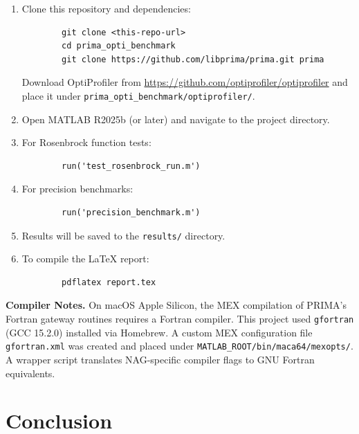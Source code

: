 \documentclass[11pt,a4paper]{article}
\begin{document}
\begin{enumerate}[leftmargin=*]
    \item Clone this repository and dependencies:
        \begin{verbatim}
        git clone <this-repo-url>
        cd prima_opti_benchmark
        git clone https://github.com/libprima/prima.git prima
        \end{verbatim}
        Download OptiProfiler from
        \url{https://github.com/optiprofiler/optiprofiler} and place it
        under \texttt{prima\_opti\_benchmark/optiprofiler/}.

    \item Open MATLAB R2025b (or later) and navigate to the project directory.

    \item For Rosenbrock function tests:
        \begin{verbatim}
        run('test_rosenbrock_run.m')
        \end{verbatim}

    \item For precision benchmarks:
        \begin{verbatim}
        run('precision_benchmark.m')
        \end{verbatim}

    \item Results will be saved to the \texttt{results/} directory.

    \item To compile the LaTeX report:
        \begin{verbatim}
        pdflatex report.tex
        \end{verbatim}
\end{enumerate}

\textbf{Compiler Notes.} On macOS Apple Silicon, the MEX compilation of PRIMA's
Fortran gateway routines requires a Fortran compiler. This project used
\texttt{gfortran} (GCC 15.2.0) installed via Homebrew. A custom MEX
configuration file \texttt{gfortran.xml} was created and placed under
\texttt{MATLAB\_ROOT/bin/maca64/mexopts/}. A wrapper script translates
NAG-specific compiler flags to GNU Fortran equivalents.

\section{Conclusion}
\end{document}
